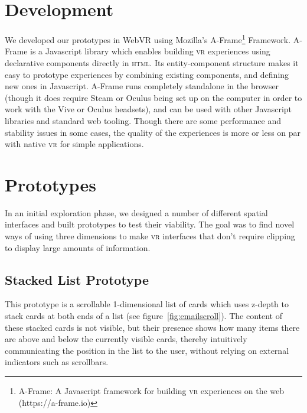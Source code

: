 \documentclass[nobib]{tufte-book} %
\begin{document}
\section{Development}
We developed our prototypes in WebVR using Mozilla's A-Frame\footnote{A-Frame: A Javascript framework for building \textsc{vr} experiences on the web (https://a-frame.io)} Framework. A-Frame is a Javascript library which enables building \textsc{vr} experiences using declarative components directly in \textsc{html}. Its entity-component structure makes it easy to prototype experiences by combining existing components, and defining new ones in Javascript. A-Frame runs completely standalone in the browser (though it does require Steam or Oculus being set up on the computer in order to work with the Vive or Oculus headsets), and can be used with other Javascript libraries and standard web tooling. Though there are some performance and stability issues in some cases, the quality of the experiences is more or less on par with native \textsc{vr} for simple applications.

\section{Prototypes}
In an initial exploration phase, we designed a number of different spatial interfaces and built prototypes to test their viability. The goal was to find novel ways of using three dimensions to make \textsc{vr} interfaces that don't require clipping to display large amounts of information.

\subsection{Stacked List Prototype}
This prototype is a scrollable 1-dimensional list of cards which uses z-depth to stack cards at both ends of a list (see figure~\ref{fig:emailscroll}). The content of these stacked cards is not visible, but their presence shows how many items there are above and below the currently visible cards, thereby intuitively communicating the position in the list to the user, without relying on external indicators such as scrollbars.
\end{document}
